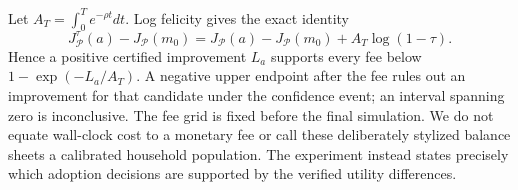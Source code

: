 Let $A_T=\int_0^T e^{-\rho t}dt$. Log felicity gives the exact identity
\begin{equation}\label{eq:r13fee}
 J_{\mathcal P}^{\tau}(a)-J_{\mathcal P}(m_0)
 =J_{\mathcal P}(a)-J_{\mathcal P}(m_0)+A_T\log(1-\tau).
\end{equation}
Hence a positive certified improvement $L_a$ supports every fee below
$1-\exp(-L_a/A_T)$. A negative upper endpoint after the fee rules out an improvement for that candidate under the confidence event; an interval spanning zero is inconclusive. The fee grid is fixed before the final simulation. We do not equate wall-clock cost to a monetary fee or call these deliberately stylized balance sheets a calibrated household population. The experiment instead states precisely which adoption decisions are supported by the verified utility differences.
